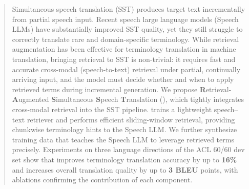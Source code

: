 
\begin{abstract}

Simultaneous speech translation (SST) produces target text incrementally from partial speech input. 
Recent speech large language models (Speech LLMs) have substantially improved SST quality, yet they still struggle to correctly translate rare and domain-specific terminology. 
While retrieval augmentation has been effective for terminology translation in machine translation, bringing retrieval to SST is non-trivial: it requires fast and accurate cross-modal (speech-to-text) retrieval under partial, continually arriving input, and the model must decide whether and when to apply retrieved terms during incremental generation.
We propose \textbf{R}etrieval-\textbf{A}ugmented \textbf{S}imultaneous \textbf{S}peech \textbf{T}ranslation (\method), which tightly integrates cross-modal retrieval into the SST pipeline. 
\method trains a lightweight speech--text retriever and performs efficient sliding-window retrieval, providing chunkwise terminology hints to the Speech LLM. 
We further synthesize training data that teaches the Speech LLM to leverage retrieved terms precisely. 
Experiments on three language directions of the ACL 60/60 dev set show that \method improves terminology translation accuracy by up to \textbf{16\%} and increases overall translation quality by up to \textbf{3 BLEU} points, with ablations confirming the contribution of each component.

\end{abstract}